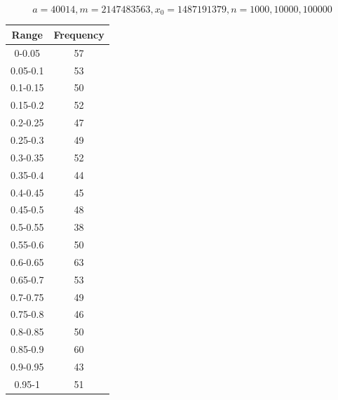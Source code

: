 \documentclass{article}
\begin{document}
\begin{table}
$$a = 40014, m = 2147483563, x_0 = 1487191379, n = 1000,10000,100000$$

\parbox{.3\linewidth}{
 \begin{tabular}{||c | c||}  \hline
		Range & Frequency \\ [0.5ex] \hline \hline0-0.05 & 57\\
		\hline 
		0.05-0.1 & 53\\
		\hline 
		0.1-0.15 & 50\\
		\hline 
		0.15-0.2 & 52\\
		\hline 
		0.2-0.25 & 47\\
		\hline 
		0.25-0.3 & 49\\
		\hline 
		0.3-0.35 & 52\\
		\hline 
		0.35-0.4 & 44\\
		\hline 
		0.4-0.45 & 45\\
		\hline 
		0.45-0.5 & 48\\
		\hline 
		0.5-0.55 & 38\\
		\hline 
		0.55-0.6 & 50\\
		\hline 
		0.6-0.65 & 63\\
		\hline 
		0.65-0.7 & 53\\
		\hline 
		0.7-0.75 & 49\\
		\hline 
		0.75-0.8 & 46\\
		\hline 
		0.8-0.85 & 50\\
		\hline 
		0.85-0.9 & 60\\
		\hline 
		0.9-0.95 & 43\\
		\hline 
		0.95-1 & 51\\
		\hline 
	\end{tabular} 

}
\end{table}
\end{document}
